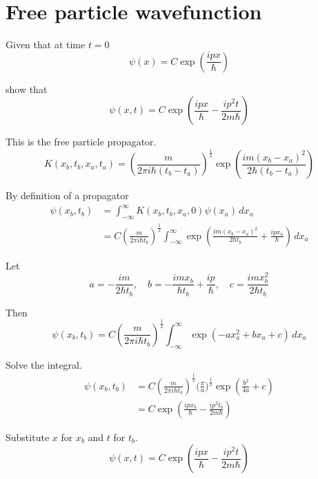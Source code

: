 


\section*{Free particle wavefunction}

Given that at time $t=0$
\begin{equation*}
\psi(x)=C\exp\left(\frac{ipx}{\hbar}\right)
\end{equation*}

show that
\begin{equation*}
\psi(x,t)=C\exp\left(\frac{ipx}{\hbar}-\frac{ip^2t}{2m\hbar}\right)
\end{equation*}

This is the free particle propagator.
\begin{equation*}
K(x_b,t_b,x_a,t_a)=\left(\frac{m}{2\pi i\hbar(t_b-t_a)}\right)^\frac{1}{2}
\exp\left(\frac{im(x_b-x_a)^2}{2\hbar(t_b-t_a)}\right)
\end{equation*}

By definition of a propagator
\begin{align*}
\psi(x_b,t_b)&=\int_{-\infty}^\infty K(x_b,t_b,x_a,0)\psi(x_a)\,dx_a
\\
&=C\left(\frac{m}{2\pi i\hbar t_b}\right)^\frac{1}{2}
\int_{-\infty}^\infty
\exp\left(\frac{im(x_b-x_a)^2}{2\hbar t_b}+\frac{ipx_a}{\hbar}\right)\,dx_a
\end{align*}

Let
\begin{equation*}
a=-\frac{im}{2\hbar t_b},\quad
b=-\frac{imx_b}{\hbar t_b}+\frac{ip}{\hbar},\quad
c=\frac{imx_b^2}{2\hbar t_b}
\end{equation*}

Then
\begin{equation*}
\psi(x_b,t_b)
=C\left(\frac{m}{2\pi i\hbar t_b}\right)^\frac{1}{2}
\int_{-\infty}^\infty
\exp(-ax_a^2+bx_a+c)\,dx_a
\tag{1}
\end{equation*}

Solve the integral.
\begin{align*}
\psi(x_b,t_b)&=C\left(\frac{m}{2\pi i\hbar t_b}\right)^\frac{1}{2}
\biggl(\frac{\pi}{a}\biggr)^\frac{1}{2}\exp\left(\frac{b^2}{4a}+c\right)
\\
&=C\exp\left(\frac{ipx_b}{\hbar}-\frac{ip^2t_b}{2m\hbar}\right)\tag{2}
\end{align*}

Substitute $x$ for $x_b$ and $t$ for $t_b$.
\begin{equation*}
\psi(x,t)=C\exp\left(\frac{ipx}{\hbar}-\frac{ip^2t}{2m\hbar}\right)
\end{equation*}


